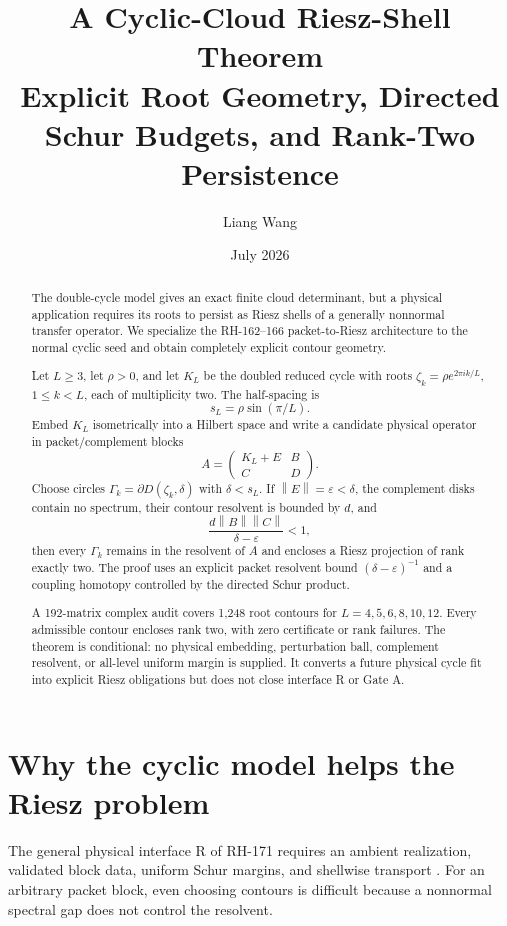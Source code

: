 \documentclass[12pt]{article}
\title{A Cyclic-Cloud Riesz-Shell Theorem\\
\large Explicit Root Geometry, Directed Schur Budgets, and Rank-Two Persistence}
\author{Liang Wang}
\date{July 2026}
\theoremstyle{remark}
\newcommand{\norm}[1]{\left\lVert#1\right\rVert}
\begin{document}
\maketitle

\begin{abstract}
The double-cycle model gives an exact finite cloud determinant, but a physical
application requires its roots to persist as Riesz shells of a generally
nonnormal transfer operator.  We specialize the RH-162--166 packet-to-Riesz
architecture to the normal cyclic seed and obtain completely explicit contour
geometry.

Let $L\ge3$, let $\rho>0$, and let
$K_L$ be the doubled reduced cycle with roots
$\zeta_k=\rho e^{2\pi ik/L}$, $1\le k<L$, each of multiplicity two.  The
half-spacing is
\[
 s_L=\rho\sin(\pi/L).
\]
Embed $K_L$ isometrically into a Hilbert space and write a candidate physical
operator in packet/complement blocks
\[
 A=\begin{pmatrix}K_L+E&B\\C&D\end{pmatrix}.
\]
Choose circles $\Gamma_k=\partial D(\zeta_k,\delta)$ with
$\delta<s_L$.  If $\norm E=\varepsilon<\delta$, the complement disks contain
no spectrum, their contour resolvent is bounded by $d$, and
\[
 \frac{d\norm B\norm C}{\delta-\varepsilon}<1,
\]
then every $\Gamma_k$ remains in the resolvent of $A$ and encloses a Riesz
projection of rank exactly two.  The proof uses an explicit packet resolvent
bound $(\delta-\varepsilon)^{-1}$ and a coupling homotopy controlled by the
directed Schur product.

A 192-matrix complex audit covers 1,248 root contours for
$L=4,5,6,8,10,12$.  Every admissible contour encloses rank two, with zero
certificate or rank failures.  The theorem is conditional: no physical
embedding, perturbation ball, complement resolvent, or all-level uniform
margin is supplied.  It converts a future physical cycle fit into explicit
Riesz obligations but does not close interface R or Gate A.
\end{abstract}

\section{Why the cyclic model helps the Riesz problem}

The general physical interface R of RH-171 requires an ambient realization,
validated block data, uniform Schur margins, and shellwise transport
\citep{WangRH171}.  For an arbitrary packet block, even choosing contours is
difficult because a nonnormal spectral gap does not control the resolvent.
\end{document}
